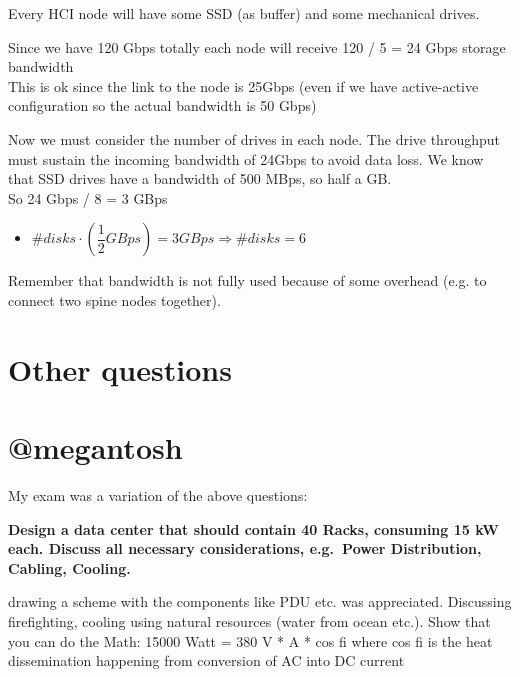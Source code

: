 Every HCI node will have some SSD (as buffer) and some mechanical
drives.

Since we have 120 Gbps totally each node will receive 120 / 5 = 24 Gbps
storage bandwidth\\
This is ok since the link to the node is 25Gbps (even if we have
active-active configuration so the actual bandwidth is 50 Gbps)

Now we must consider the number of drives in each node. The drive
throughput must sustain the incoming bandwidth of 24Gbps to avoid data
loss. We know that SSD drives have a bandwidth of 500 MBps, so half a
GB.\\
So 24 Gbps / 8 = 3 GBps

\begin{itemize}
\item
  $\#disks \cdot (\dfrac{1}{2} GBps) = 3 GBps \Longrightarrow \#disks = 6$
\end{itemize}

Remember that bandwidth is not fully used because of some
overhead (e.g. to connect two spine nodes together).


\hypertarget{other-questions}{%
\section{Other questions}\label{other-questions}}

\hypertarget{megantosh}{%
\section{@megantosh}\label{megantosh}}

My exam was a variation of the above questions:

\textbf{Design a data center that should contain 40 Racks, consuming 15
kW each. Discuss all necessary considerations, e.g.~Power Distribution,
Cabling, Cooling.}

drawing a scheme with the components like PDU etc. was appreciated.
Discussing firefighting, cooling using natural resources (water from
ocean etc.). Show that you can do the Math: 15000 Watt = 380 V * A * cos
fi where cos fi is the heat dissemination happening from conversion of
AC into DC current

